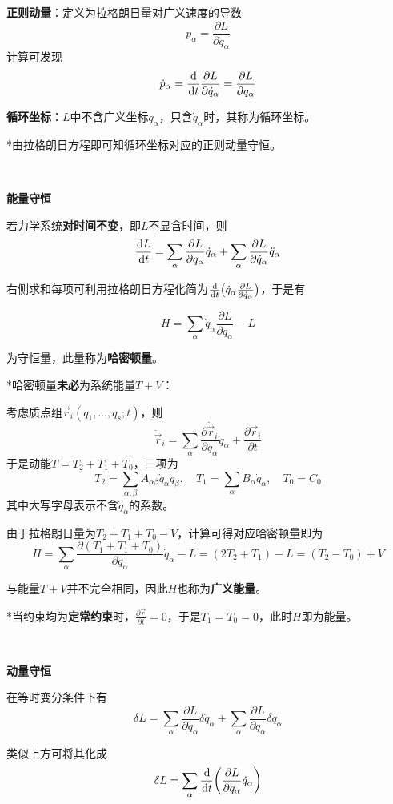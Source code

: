 \documentclass[a4paper,UTF8,fontset=windows]{ctexart}
\newcommand*{\dr}{\hspace{0.07em}\mathrm{d}}
\begin{document}
\textbf{正则动量}：定义为拉格朗日量对广义速度的导数
$$p_\alpha=\frac{\partial L}{\partial\dot{q}_\alpha}$$
计算可发现
$$\dot{p}_\alpha=\frac{\dr}{\dr t}\frac{\partial L}{\partial\dot{q}_\alpha}=\frac{\partial L}{\partial q_\alpha}$$

\textbf{循环坐标}：$L$中不含广义坐标$q_\alpha$，只含$\dot{q}_\alpha$时，其称为循环坐标。

*由拉格朗日方程即可知循环坐标对应的正则动量守恒。

\

\textbf{能量守恒}

若力学系统\textbf{对时间不变}，即$L$不显含时间，则
$$\frac{\dr L}{\dr t}=\sum_\alpha\frac{\partial L}{\partial q_\alpha}\dot{q}_\alpha+\sum_\alpha\frac{\partial L}{\partial\dot{q}_\alpha}\ddot{q}_\alpha$$

右侧求和每项可利用拉格朗日方程化简为$\frac{\dr}{\dr t}\big(\dot{q}_\alpha\frac{\partial L}{\partial\dot{q}_\alpha}\big)$，于是有

$$H=\sum_\alpha\dot{q}_\alpha\frac{\partial L}{\partial\dot{q}_\alpha}-L$$

为守恒量，此量称为\textbf{哈密顿量}。

*哈密顿量\textbf{未必}为系统能量$T+V$：

考虑质点组$\vec{r}_i(q_1,\dots,q_s;t)$，则
$$\dot{\vec{r}}_i=\sum_\alpha\frac{\partial\dot{\vec{r}}_i}{\partial q_\alpha}\dot{q}_\alpha+\frac{\partial\vec{r}_i}{\partial t}$$
于是动能$T=T_2+T_1+T_0$，三项为
$$T_2=\sum_{\alpha,\beta}A_{\alpha\beta}\dot{q}_\alpha\dot{q}_\beta,\quad T_1=\sum_\alpha B_\alpha\dot{q}_\alpha,\quad T_0=C_0$$
其中大写字母表示不含$\dot{q}_\alpha$的系数。

由于拉格朗日量为$T_2+T_1+T_0-V$，计算可得对应哈密顿量即为
$$H=\sum_\alpha\frac{\partial(T_1+T_1+T_0)}{\partial\dot{q}_\alpha}\dot{q}_\alpha-L=(2T_2+T_1)-L=(T_2-T_0)+V$$

与能量$T+V$并不完全相同，因此$H$也称为\textbf{广义能量}。

*当约束均为\textbf{定常约束}时，$\frac{\partial\vec{r}}{\partial t}=0$，于是$T_1=T_0=0$，此时$H$即为能量。

\

\textbf{动量守恒}

在等时变分条件下有
$$\delta L=\sum_\alpha\frac{\partial L}{\partial\dot{q}_\alpha}\delta\dot{q}_\alpha+\sum_\alpha\frac{\partial L}{\partial q_\alpha}\delta q_\alpha$$

类似上方可将其化成
$$\delta L=\sum_\alpha\frac{\dr}{\dr t}\bigg(\frac{\partial L}{\partial q_\alpha}\dot{q}_\alpha\bigg)$$
\end{document}

